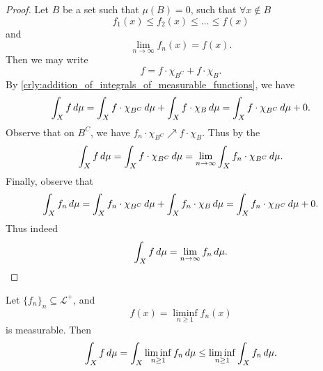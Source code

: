 \documentclass[notoc,notitlepage]{tufte-book}
\begin{document}
\begin{proof}
  Let $B$ be a set such that $\mu(B) = 0$,
  such that $\forall x \notin B$
  \begin{equation*}
    f_1(x) \leq f_2(x) \leq \hdots \leq f(x)
  \end{equation*}
  and
  \begin{equation*}
    \lim_{n \to \infty} f_n(x) = f(x).
  \end{equation*}
  Then we may write
  \begin{equation*}
    f = f \cdot \chi_{B^C} + f \cdot \chi_{B}.
  \end{equation*}
  By \cref{crly:addition_of_integrals_of_measurable_functions},
  we have
  \begin{equation*}
    \int_{X} f \mathop{}\!d{\mu}
    = \int_{X} f \cdot \chi_{B^C} \mathop{}\!d{\mu} + \int_{X} f \cdot \chi_B \mathop{}\!d{\mu}
    = \int_{X} f \cdot \chi_{B^C} \mathop{}\!d{\mu} + 0.
  \end{equation*}
  Observe that on $B^C$, we have $f_n \cdot \chi_{B^C} \nearrow f \cdot \chi_B$.
  Thus by the 
  \begin{equation*}
    \int_{X} f \mathop{}\!d{\mu}
    = \int_{X} f \cdot \chi_{B^C} \mathop{}\!d{\mu}
    = \lim_{n \to \infty} \int_{X} f_n \cdot \chi_{B^C} \mathop{}\!d{\mu}.
  \end{equation*}
  Finally, observe that
  \begin{equation*}
    \int_{X} f_n \mathop{}\!d{\mu}
    = \int_{X} f_n \cdot \chi_{B^C} \mathop{}\!d{\mu} + \int_{X} f_n \cdot \chi_B \mathop{}\!d{\mu}
    = \int_{X} f_n \cdot \chi_{B^C} \mathop{}\!d{\mu} + 0.
  \end{equation*}
  Thus indeed
  \begin{equation*}
    \int_{X} f \mathop{}\!d{\mu} = \lim_{n \to \infty} f_n \mathop{}\!d{\mu}.
  \end{equation*}
\end{proof}

\begin{thm}\label{thm:fatou_s_lemma}
  Let $\{ f_n \}_n \subseteq \mathcal{L}^+$, and
  \begin{equation*}
    f(x) = \liminf_{n \geq 1} f_n(x)
  \end{equation*}
  is measurable.
  Then
  \begin{equation*}
    \int_{X} f \mathop{}\!d{\mu}
    = \int_{X} \liminf_{n \geq 1} f_n \mathop{}\!d{\mu}
    \leq \liminf_{n \geq 1} \int_{X} f_n \mathop{}\!d{\mu}.
  \end{equation*}
\end{thm}
\end{document}
